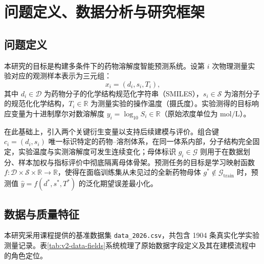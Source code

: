 \section{问题定义、数据分析与研究框架}\label{sec:v2-data}

\subsection{问题定义}\label{sec:v2-common-problem}

本研究的目标是构建多条件下的药物溶解度智能预测系统。设第 $i$ 次物理测量实验对应的观测样本表示为三元组：
\begin{equation}
x_i = (d_i, s_i, T_i),
\end{equation}
其中 $d_i \in \mathcal{D}$ 为药物分子的化学结构规范化字符串（SMILES），$s_i \in \mathcal{S}$ 为溶剂分子的规范化化学结构，$T_i \in \mathbb{R}$ 为测量实验的操作温度（摄氏度）。实验测得的目标响应变量为十进制摩尔对数溶解度 $y_i = \log_{10} S_i \in \mathbb{R}$（原始浓度单位为 $\mathrm{mol/L}$）。

在此基础上，引入两个关键衍生变量以支持后续建模与评价。组合键 $c_i = (d_i, s_i)$ 唯一标识特定的药物--溶剂体系，在同一体系内部，分子结构完全固定，实验温度与实测溶解度可发生连续变化；母体标识 $g_i \in \mathcal{G}$ 则用于在数据划分、样本加权与指标评价中彻底隔离母体骨架。预测任务的目标是学习映射函数 $f: \mathcal{D} \times \mathcal{S} \times \mathbb{R} \to \mathbb{R}$，使得在面临训练集从未见过的全新药物母体 $g^* \notin \mathcal{G}_{\mathrm{train}}$ 时，预测值 $\widehat y = f(d^*, s^*, T^*)$ 的泛化期望误差最小化。

\subsection{数据与质量特征}

本研究采用课程提供的基准数据集 \texttt{data\_2026.csv}，共包含 1904 条真实化学实验测量记录。表\ref{tab:v2-data-fields}系统梳理了原始数据字段定义及其在建模流程中的角色定位。

